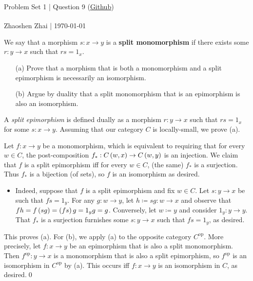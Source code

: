 \documentclass{article}
\begin{document}
    \begin{center}
        \large{Problem Set 1 | Question 9 (\href{https://github.com/zhaoshenzhai/CatTheory-F23/blob/master/Problem_Set_1/Questions.pdf}{Github})}\\\ \\
        \normalsize{Zhaoshen Zhai | \today}
    \end{center}

    \begin{exercise}
        We say that a morphism $s:x\to y$ is a \textbf{split monomorphism} if there exists some $r:y\to x$ such that $rs=1_x$.
        \begin{itemize}
            \item[(a)] Prove that a morphism that is both a monomorphism and a split epimorphism is necessarily an isomorphism.
            \item[(b)] Argue by duality that a split monomorphism that is an epimorphism is also an isomorphism.
        \end{itemize}
    \end{exercise}
    \begin{solution}
        A \textit{split epimorphism} is defined dually as a morphism $r:y\to x$ such that $rs=1_x$ for some $s:x\to y$. Assuming that our category $C$ is locally-small, we prove (a).
        
        Let $f:x\to y$ be a monomorphism, which is equivalent to requiring that for every $w\in C$, the post-composition $f_\ast:C\left(w,x\right)\to C\left(w,y\right)$ is an injection. We claim that $f$ is a split epimorphism iff for every $w\in C$, (the same) $f_\ast$ is a surjection. Thus $f_\ast$ is a bijection (of sets), so $f$ is an isomorphism as desired.
        \begin{itemize}
            \item Indeed, suppose that $f$ is a split epimorphism and fix $w\in C$. Let $s:y\to x$ be such that $fs=1_y$. For any $g:w\to y$, let $h\coloneqq sg:w\to x$ and observe that $fh=f\left(sg\right)=\left(fs\right)g=1_yg=g$. Conversely, let $w\coloneqq y$ and consider $1_y:y\to y$. That $f_\ast$ is a surjection furnishes some $s:y\to x$ such that $fs=1_y$, as desired.
        \end{itemize}
        This proves (a). For (b), we apply (a) to the opposite category $C^\textrm{op}$. More precisely, let $f:x\to y$ be an epimorphism that is also a split monomorphism. Then $f^\textrm{op}:y\to x$ is a monomorphism that is also a split epimorphism, so $f^\textrm{op}$ is an isomorphism in $C^\textrm{op}$ by (a). This occurs iff $f:x\to y$ is an isomorphism in $C$, as desired.\qed
    \end{solution}
\end{document}
